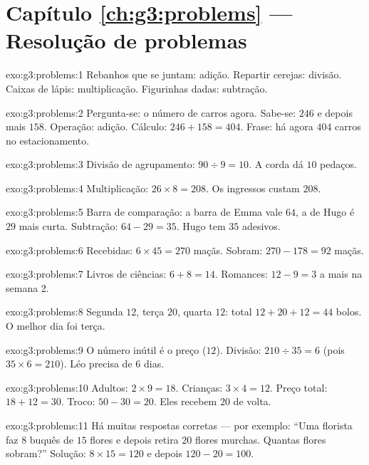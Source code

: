 \section*{Capítulo \ref{ch:g3:problems} --- Resolução de problemas}

\begin{solution}{exo:g3:problems:1}
Rebanhos que se juntam: adição. Repartir cerejas: divisão. Caixas de
lápis: multiplicação. Figurinhas dadas: subtração.
\end{solution}

\begin{solution}{exo:g3:problems:2}
Pergunta-se: o número de carros agora. Sabe-se: $246$ e depois mais
$158$. Operação: adição. Cálculo: $246 + 158 = 404$. Frase: há agora
$404$ carros no estacionamento.
\end{solution}

\begin{solution}{exo:g3:problems:3}
Divisão de agrupamento: $90 \div 9 = 10$. A corda dá $10$ pedaços.
\end{solution}

\begin{solution}{exo:g3:problems:4}
Multiplicação: $26 \times 8 = 208$. Os ingressos custam $208$.
\end{solution}

\begin{solution}{exo:g3:problems:5}
Barra de comparação: a barra de Emma vale $64$, a de Hugo é $29$ mais
curta. Subtração: $64 - 29 = 35$. Hugo tem $35$ adesivos.
\end{solution}

\begin{solution}{exo:g3:problems:6}
Recebidas: $6 \times 45 = 270$ maçãs. Sobram:
$270 - 178 = 92$ maçãs.
\end{solution}

\begin{solution}{exo:g3:problems:7}
Livros de ciências: $6 + 8 = 14$. Romances: $12 - 9 = 3$ a mais na
semana 2.
\end{solution}

\begin{solution}{exo:g3:problems:8}
Segunda $12$, terça $20$, quarta $12$: total $12 + 20 + 12 = 44$
bolos. O melhor dia foi terça.
\end{solution}

\begin{solution}{exo:g3:problems:9}
O número inútil é o preço ($12$). Divisão: $210 \div 35 = 6$ (pois
$35 \times 6 = 210$). Léo precisa de $6$ dias.
\end{solution}

\begin{solution}{exo:g3:problems:10}
Adultos: $2 \times 9 = 18$. Crianças: $3 \times 4 = 12$. Preço
total: $18 + 12 = 30$. Troco: $50 - 30 = 20$. Eles recebem $20$ de
volta.
\end{solution}

\begin{solution}{exo:g3:problems:11}
Há muitas respostas corretas --- por exemplo: ``Uma florista faz $8$
buquês de $15$ flores e depois retira $20$ flores murchas. Quantas
flores sobram?'' Solução: $8 \times 15 = 120$ e depois
$120 - 20 = 100$.
\end{solution}

